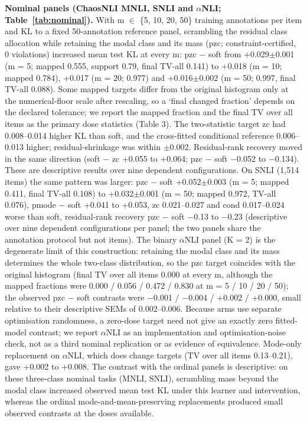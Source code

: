 \documentclass[10pt]{article}
\begin{document}

\textbf{Nominal panels (ChaosNLI MNLI, SNLI and $\alpha$NLI; Table~\ref{tab:nominal}).} With m $\in$ \{5, 10, 20, 50\} training annotations per item and KL to a fixed 50-annotation reference panel, scrambling the residual class allocation while retaining the modal class and its mass (pzc; constraint-certified, 0 violations) increased mean test KL at every m: pzc $-$ soft from +0.029$\pm$0.001 (m = 5; mapped 0.555, support 0.79, final TV-all 0.141) to +0.018 (m = 10; mapped 0.784), +0.017 (m = 20; 0.977) and +0.016$\pm$0.002 (m = 50; 0.997, final TV-all 0.088). Some mapped targets differ from the original histogram only at the numerical-floor scale after rescaling, so a `final changed fraction' depends on the declared tolerance; we report the mapped fraction and the final TV over all items as the primary dose statistics (Table 3). The two-statistic target zc had 0.008--0.014 higher KL than soft, and the cross-fitted conditional reference 0.006--0.013 higher; residual-shrinkage was within $\pm$0.002. Residual-rank recovery moved in the same direction (soft $-$ zc +0.055 to +0.064; pzc $-$ soft $-$0.052 to $-$0.134). These are descriptive results over nine dependent configurations. On SNLI (1,514 items) the same pattern was larger: pzc $-$ soft +0.052$\pm$0.003 (m = 5; mapped 0.411, final TV-all 0.108) to +0.032$\pm$0.001 (m = 50; mapped 0.972, TV-all 0.076), pmode $-$ soft +0.041 to +0.053, zc 0.021--0.027 and cond 0.017--0.024 worse than soft, residual-rank recovery pzc $-$ soft $-$0.13 to $-$0.23 (descriptive over nine dependent configurations per panel; the two panels share the annotation protocol but not items). The binary $\alpha$NLI panel (K = 2) is the degenerate limit of this construction: retaining the modal class and its mass determines the whole two-class distribution, so the pzc target coincides with the original histogram (final TV over all items 0.000 at every m, although the mapped fractions were 0.000 / 0.056 / 0.472 / 0.830 at m = 5 / 10 / 20 / 50); the observed pzc $-$ soft contrasts were $-$0.001 / $-$0.004 / +0.002 / +0.000, small relative to their descriptive SEMs of 0.002--0.006. Because arms use separate optimisation randomness, a zero-dose target need not give an exactly zero fitted-model contrast; we report $\alpha$NLI as an implementation and optimisation-noise check, not as a third nominal replication or as evidence of equivalence. Mode-only replacement on $\alpha$NLI, which does change targets (TV over all items 0.13--0.21), gave +0.002 to +0.008. The contrast with the ordinal panels is descriptive: on these three-class nominal tasks (MNLI, SNLI), scrambling mass beyond the modal class increased observed mean test KL under this learner and intervention, whereas the ordinal mode-and-mean-preserving replacements produced small observed contrasts at the doses available.
\end{document}
